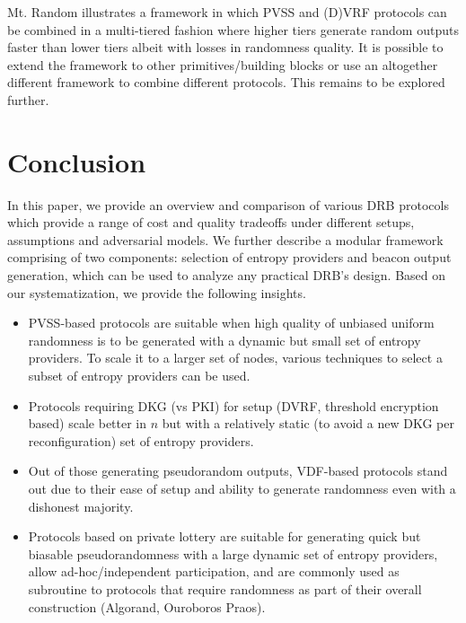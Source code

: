 \documentclass[letterpaper,twocolumn,10pt]{article}
\theoremstyle{definition}
\theoremstyle{remark}
\newcommand{\todo}[1]{\textcolor{red}{\textbf{TODO:} #1}}
\begin{document}
Mt. Random illustrates a framework in which PVSS and (D)VRF protocols can be combined in a multi-tiered fashion where higher tiers generate random outputs faster than lower tiers albeit with losses in randomness quality. It is possible to extend the framework to other primitives/building blocks or use an altogether different framework to combine different protocols. This remains to be explored further.
\fi
\section{Conclusion}
In this paper, we provide an overview and comparison of various DRB protocols which provide a range of cost and quality tradeoffs under different setups, assumptions and adversarial models. We further describe a modular framework comprising of two components: selection of entropy providers and beacon output generation, which can be used to analyze any practical DRB's design. Based on our systematization, we provide the following insights.
\begin{itemize}
    \item PVSS-based protocols are suitable when high quality of unbiased uniform randomness is to be generated with a dynamic but small set of entropy providers. To scale it to a larger set of nodes, various techniques to select a subset of entropy providers can be used.
    \item Protocols requiring DKG (vs PKI) for setup (DVRF, threshold encryption based) scale better in $n$ but with a relatively static (to avoid a new DKG per reconfiguration) set of entropy providers.
    \item Out of those generating pseudorandom outputs, VDF-based protocols stand out due to their ease of setup and ability to generate randomness even with a dishonest majority.
    \item Protocols based on private lottery are suitable for generating quick but biasable pseudorandomness with a large dynamic set of entropy providers, allow ad-hoc/independent participation, and are commonly used as subroutine to protocols that require randomness as part of their overall construction (Algorand, Ouroboros Praos).
\end{itemize}
\end{document}
